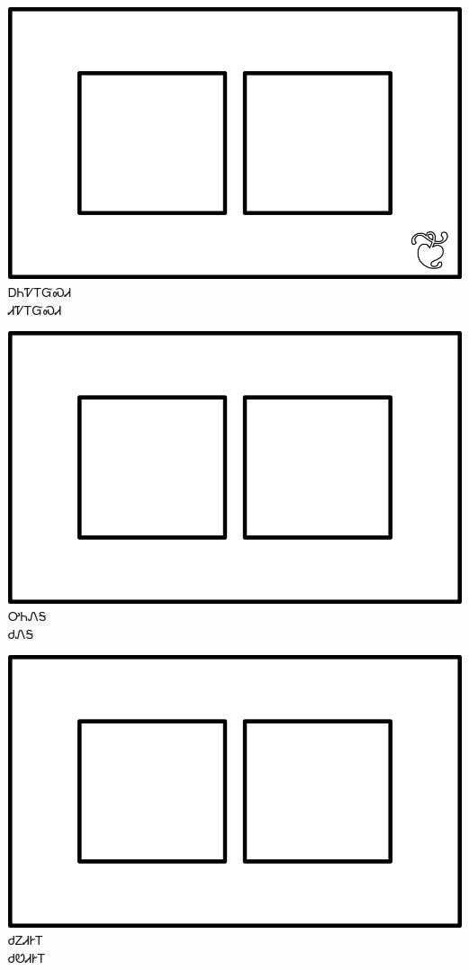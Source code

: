\documentclass[avery5371]{flashcards}%
\begin{document}

\begin{flashcard}{
\includegraphics[width=0.95\columnwidth,height=.51\columnwidth,keepaspectratio]{../artwork/for-colors/squares-white-with-leaf}
}\Huge ᎠᏂᏤᎢᏳᏍᏗ\\ᏗᏤᎢᏳᏍᏗ
\end{flashcard}

\begin{flashcard}{
\includegraphics[width=0.95\columnwidth,height=.51\columnwidth,keepaspectratio]{../artwork/for-colors/squares-white}
}\Huge ᎤᏂᏁᎦ\\ᏧᏁᎦ
\end{flashcard}

\begin{flashcard}{
\includegraphics[width=0.95\columnwidth,height=.51\columnwidth,keepaspectratio]{../artwork/for-colors/squares-white}
}\Huge ᏧᏃᏗᎨᎢ\\ᏧᏬᏗᎨᎢ
\end{flashcard}
\end{document}
